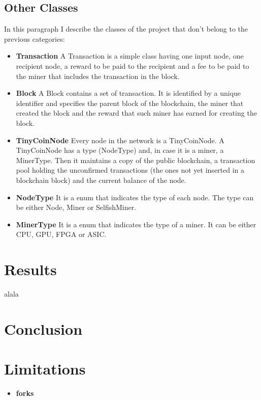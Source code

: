 \documentclass{article}
\begin{document}
\subsection{Other Classes} 
In this paragraph I describe the classes of the project that don't belong to the previous categories:
\begin{itemize}
\item \textbf{Transaction} A Transaction is a simple class having one input node, one recipient node, a reward to be paid to the recipient and a fee to be paid to the miner that includes the transaction in the block.
\item \textbf{Block} A Block contains a set of transaction. It is identified by a unique identifier and specifies the parent block of the blockchain, the miner that created the block and the reward that such miner has earned for creating the block.
\item \textbf{TinyCoinNode} Every node in the network is a TinyCoinNode. A TinyCoinNode has a type (NodeType) and, in case it is a miner, a MinerType. Then it maintains a copy of the public blockchain, a transaction pool holding the unconfirmed transactions (the ones not yet inserted in a blockchain block) and the current balance of the node.
\item \textbf{NodeType} It is a enum that indicates the type of each node. The type can be either Node, Miner or SelfishMiner.
\item \textbf{MinerType} It is a enum that indicates the type of a miner. It can be either CPU, GPU, FPGA or ASIC.
\end{itemize}


\section{Results}



alala


\section{Conclusion}




\section{Limitations} 

\begin{itemize}
\item \textbf{forks}
\end{itemize}
\end{document}
